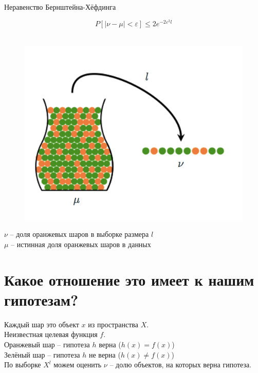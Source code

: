 \documentclass[10pt]{beamer}
\begin{document}
\begin{frame}{Неравенство Бернштейна-Хёфдинга}
  \begin{minipage}[t]{0.5\linewidth}
    $$P[\vert \nu - \mu \vert < \varepsilon ] \leq 2 e^{-2 \varepsilon^2 l} $$\\
  \end{minipage}%
  \begin{minipage}{0.45\textwidth}
    \begin{center}
      \begin{figure}
        \includegraphics[width=\textwidth, keepaspectratio]{images/bin}    
      \end{figure}
    \end{center}

  \end{minipage}%
    \bigbreak
    $\nu$ -- доля оранжевых шаров в выборке размера $l$\\
    $\mu$ -- истинная доля оранжевых шаров в данных 
  
\end{frame}

\section{Какое отношение это имеет к нашим гипотезам?}

\begin{frame}
  Каждый шар это объект $x$ из пространства $X$.\\
  Неизвестная целевая функция $f$.\\
  \bigbreak
  Оранжевый шар -- гипотеза $h$ верна ($h(x) = f(x)$)\\
  Зелёный шар -- гипотеза $h$ не верна ($h(x) \neq f(x)$)\\
  \bigbreak
  По выборке $X^l$ можем оценить $\nu$ -- долю объектов, на которых верна гипотеза.
\end{frame}
\end{document}

